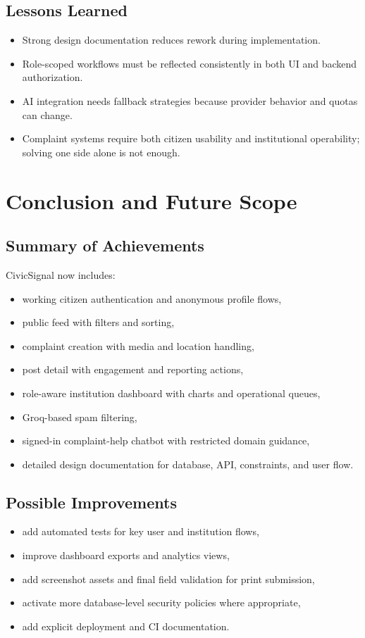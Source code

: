 \documentclass[12pt,a4paper]{report}
\begin{document}
\section{Lessons Learned}
\begin{itemize}
  \item Strong design documentation reduces rework during implementation.
  \item Role-scoped workflows must be reflected consistently in both UI and backend authorization.
  \item AI integration needs fallback strategies because provider behavior and quotas can change.
  \item Complaint systems require both citizen usability and institutional operability; solving one side alone is not enough.
\end{itemize}

\chapter{Conclusion and Future Scope}
\section{Summary of Achievements}
CivicSignal now includes:
\begin{itemize}
  \item working citizen authentication and anonymous profile flows,
  \item public feed with filters and sorting,
  \item complaint creation with media and location handling,
  \item post detail with engagement and reporting actions,
  \item role-aware institution dashboard with charts and operational queues,
  \item Groq-based spam filtering,
  \item signed-in complaint-help chatbot with restricted domain guidance,
  \item detailed design documentation for database, API, constraints, and user flow.
\end{itemize}

\section{Possible Improvements}
\begin{itemize}
  \item add automated tests for key user and institution flows,
  \item improve dashboard exports and analytics views,
  \item add screenshot assets and final field validation for print submission,
  \item activate more database-level security policies where appropriate,
  \item add explicit deployment and CI documentation.
\end{itemize}
\end{document}
